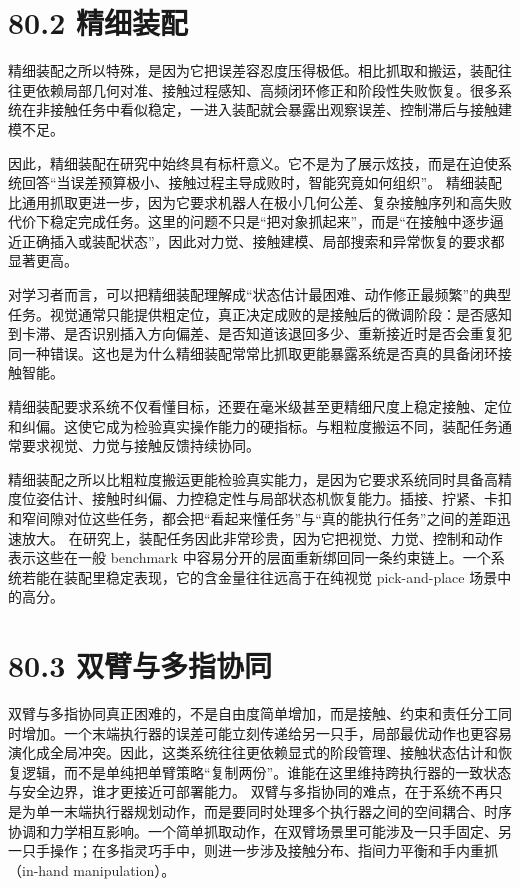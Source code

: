 \section*{80.2 精细装配}


精细装配之所以特殊，是因为它把误差容忍度压得极低。相比抓取和搬运，装配往往更依赖局部几何对准、接触过程感知、高频闭环修正和阶段性失败恢复。很多系统在非接触任务中看似稳定，一进入装配就会暴露出观察误差、控制滞后与接触建模不足。

因此，精细装配在研究中始终具有标杆意义。它不是为了展示炫技，而是在迫使系统回答“当误差预算极小、接触过程主导成败时，智能究竟如何组织”。 精细装配比通用抓取更进一步，因为它要求机器人在极小几何公差、复杂接触序列和高失败代价下稳定完成任务。这里的问题不只是“把对象抓起来”，而是“在接触中逐步逼近正确插入或装配状态”，因此对力觉、接触建模、局部搜索和异常恢复的要求都显著更高。

对学习者而言，可以把精细装配理解成“状态估计最困难、动作修正最频繁”的典型任务。视觉通常只能提供粗定位，真正决定成败的是接触后的微调阶段：是否感知到卡滞、是否识别插入方向偏差、是否知道该退回多少、重新接近时是否会重复犯同一种错误。这也是为什么精细装配常常比抓取更能暴露系统是否真的具备闭环接触智能。

精细装配要求系统不仅看懂目标，还要在毫米级甚至更精细尺度上稳定接触、定位和纠偏。这使它成为检验真实操作能力的硬指标。与粗粒度搬运不同，装配任务通常要求视觉、力觉与接触反馈持续协同。

精细装配之所以比粗粒度搬运更能检验真实能力，是因为它要求系统同时具备高精度位姿估计、接触时纠偏、力控稳定性与局部状态机恢复能力。插接、拧紧、卡扣和窄间隙对位这些任务，都会把“看起来懂任务”与“真的能执行任务”之间的差距迅速放大。 在研究上，装配任务因此非常珍贵，因为它把视觉、力觉、控制和动作表示这些在一般 benchmark 中容易分开的层面重新绑回同一条约束链上。一个系统若能在装配里稳定表现，它的含金量往往远高于在纯视觉 pick-and-place 场景中的高分。

\section*{80.3 双臂与多指协同}


双臂与多指协同真正困难的，不是自由度简单增加，而是接触、约束和责任分工同时增加。一个末端执行器的误差可能立刻传递给另一只手，局部最优动作也更容易演化成全局冲突。因此，这类系统往往更依赖显式的阶段管理、接触状态估计和恢复逻辑，而不是单纯把单臂策略“复制两份”。谁能在这里维持跨执行器的一致状态与安全边界，谁才更接近可部署能力。 双臂与多指协同的难点，在于系统不再只是为单一末端执行器规划动作，而是要同时处理多个执行器之间的空间耦合、时序协调和力学相互影响。一个简单抓取动作，在双臂场景里可能涉及一只手固定、另一只手操作；在多指灵巧手中，则进一步涉及接触分布、指间力平衡和手内重抓（in-hand manipulation）。

